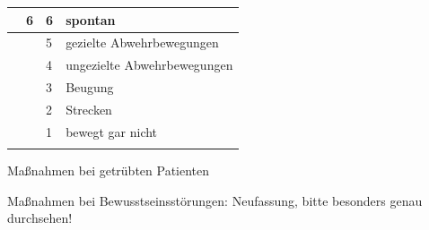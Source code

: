 \documentclass{article}
\begin{document}
\begin{flushleft}
\begin{supertabular}{m{3.224cm}m{0.874cm}|m{1.1459999cm}|m{7.649cm}|}
{\begin{itemize}
\end{itemize}
} &
6

 &
6

 &
spontan

\\\hline
 &
 &
5

 &
gezielte Abwehrbewegungen

\\\hhline{~~--}
 &
 &
4

 &
ungezielte Abwehrbewegungen

\\\hhline{~~--}
 &
 &
3

 &
Beugung

\\\hhline{~~--}
 &
 &
2

 &
Strecken

\\\hhline{~~--}
 &
 &
1

 &
bewegt gar nicht

\\\hhline{~~--}
\end{supertabular}
\end{flushleft}
Ma{\ss}nahmen bei getr\"ubten Patienten

Ma{\ss}nahmen bei Bewusstseinsst\"orungen: Neufassung, bitte besonders
genau durchsehen!%
%
\end{document}
